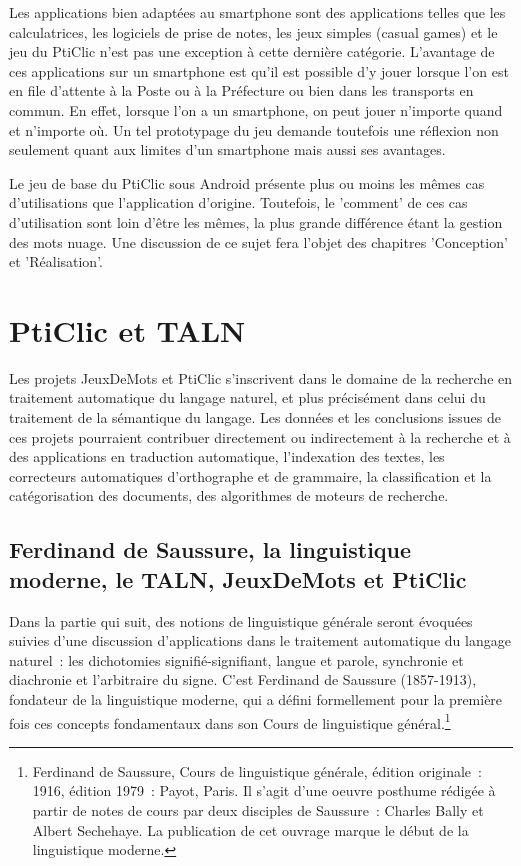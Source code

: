 \documentclass[a4paper,11pt,french]{article}
\def\android{Android\texttrademark{}}
\begin{document}
Les applications bien adaptées au smartphone sont des applications telles que les calculatrices, les logiciels de prise de notes, les jeux
simples (casual games) et le jeu du PtiClic n'est pas une exception à cette dernière catégorie. L'avantage de ces applications sur un smartphone est
qu'il est possible d'y jouer lorsque l'on est en file d'attente à la Poste ou à la Préfecture ou bien dans les transports en commun. En effet, lorsque l'on a un smartphone, on peut jouer n'importe quand et n'importe où. Un tel
prototypage du jeu demande toutefois une réflexion non seulement quant aux limites d'un smartphone mais aussi ses avantages.

Le jeu de base du PtiClic sous \android{} présente plus ou moins les mêmes cas d'utilisations que l'application d'origine. Toutefois, le 'comment' de ces cas d'utilisation sont loin d'être les mêmes, la plus grande différence étant la gestion des mots nuage. Une discussion de ce sujet fera l'objet des chapitres 'Conception' et 'Réalisation'.

\pagebreak

\section{PtiClic et TALN}


Les projets JeuxDeMots et PtiClic s'inscrivent dans le domaine de la recherche en traitement automatique du langage naturel, et plus précisément dans celui du traitement de la sémantique du langage. Les données et les conclusions issues de ces projets pourraient contribuer directement ou indirectement à la recherche et à des applications en traduction automatique, l'indexation des textes, les correcteurs automatiques d'orthographe et de grammaire, la classification et la catégorisation des documents, des algorithmes de moteurs de recherche.


\subsection{Ferdinand de Saussure, la linguistique moderne, le TALN, JeuxDeMots et PtiClic}

Dans la partie qui suit, des notions de linguistique générale seront évoquées suivies d'une discussion d'applications dans le traitement automatique du langage naturel~: les dichotomies signifié-signifiant, langue et parole, synchronie et diachronie et l'arbitraire du signe. C'est Ferdinand de Saussure (1857-1913), fondateur de la linguistique moderne, qui a défini formellement pour la première fois ces concepts fondamentaux dans son Cours de linguistique général.\footnote{Ferdinand de Saussure, Cours de linguistique générale, édition originale~: 1916, édition 1979~: Payot, Paris. Il s'agit d'une oeuvre posthume rédigée à partir de notes de cours par deux disciples de Saussure~: Charles Bally et Albert Sechehaye. La publication de cet ouvrage marque le début de la linguistique moderne.}
\end{document}
